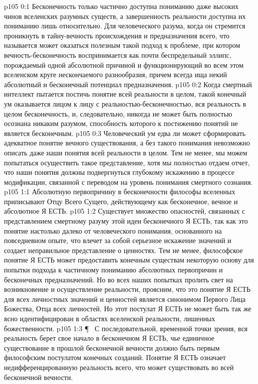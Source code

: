 \author{Мелхиседек}
\vs p105 0:1 Бесконечность только частично доступна пониманию даже высоких чинов вселенских разумных существ, а завершенность реальности доступна их пониманию лишь относительно. Для человеческого разума, когда он стремится проникнуть в тайну\hyp{}вечность происхождения и предназначения всего, что называется  может оказаться полезным такой подход к проблеме, при котором вечность\hyp{}бесконечность воспринимается как почти беспредельный эллипс, порождаемый одной абсолютной причиной и функционирующий во всем этом вселенском круге нескончаемого разнообразия, причем всегда ища некий абсолютный и бесконечный потенциал предназначения.
\vs p105 0:2 Когда смертный интеллект пытается постичь понятие всей реальности в целом, такой конечный ум оказывается лицом к лицу с реальностью\hyp{}бесконечностью, вся реальность в целом  бесконечность, и, следовательно, никогда не может быть полностью осознана никаким разумом, способность которого к постижению понятий не является бесконечным.
\vs p105 0:3 Человеческий ум едва ли может сформировать адекватное понятие вечного существования, а без такого понимания невозможно описать даже наши понятия всей реальности в целом. Тем не менее, мы можем попытаться осуществить такое представление, хотя мы полностью отдаем отчет, что наши понятия должны подвергнуться глубокому искажению в процессе модификации, связанной с переводом на уровень понимания смертного сознания.
\vs p105 1:1 Абсолютную первопричину в бесконечности философы вселенных приписывают Отцу Всего Сущего, действующему как бесконечное, вечное и абсолютное Я ЕСТЬ.
\vs p105 1:2 Существует множество опасностей, связанных с представлением смертному разуму этой идеи бесконечного Я ЕСТЬ, так как это понятие настолько далеко от человеческого понимания, основанного на повседневном опыте, что влечет за собой серьезное искажение значений и создает неправильное представление о ценностях. Тем не менее, философское понятие Я ЕСТЬ может предоставить конечным существам некоторую основу для попытки подхода к частичному пониманию абсолютных первопричин и бесконечных предназначений. Но во всех наших попытках пролить свет на возникновение и осуществление реальности, проясним, что это понятие Я ЕСТЬ для всех личностных значений и ценностей является синонимом Первого Лица Божества, Отца всех личностей. Но этот постулат Я ЕСТЬ не может быть так же ясно идентифицирован в областях вселенской реальности, лишенных божественности.
\vs p105 1:3 \P\  С последовательной, временной точки зрения, вся реальность берет свое начало в бесконечном Я ЕСТЬ, чье единичное существование в прошлой бесконечной вечности должно быть первым философским постулатом конечных созданий. Понятие Я ЕСТЬ означает  недифференцированную реальность всего, что может существовать во всей бесконечной вечности.
